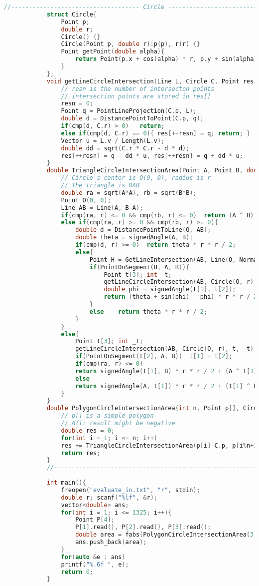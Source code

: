 \documentclass[withoutpreface,bwprint,fontset=macnew]{cumcmthesis} %
\begin{document}
\begin{appendices}
\begin{lstlisting}[language=c++]
			//------------------------------------ Circle ------------------------------------//
			struct Circle{
				Point p;
				double r;
				Circle() {}
				Circle(Point p, double r):p(p), r(r) {}
				Point getPoint(double alpha){
					return Point(p.x + cos(alpha) * r, p.y + sin(alpha) * r);
				}
			};
			void getLineCircleIntersection(Line L, Circle C, Point res[], int &resn){
				// resn is the number of intersecton points
				// intersection points are stored in res[]
				resn = 0;
				Point q = PointLineProjection(C.p, L);
				double d = DistancePointToPoint(C.p, q);
				if(cmp(d, C.r) > 0)   return;                           // separated
				else if(cmp(d, C.r) == 0){ res[++resn] = q; return; }   // tangent
				Vector u = L.v / Length(L.v);
				double dd = sqrt(C.r * C.r - d * d);
				res[++resn] = q - dd * u, res[++resn] = q + dd * u;     // intersected
			}
			double TriangleCircleIntersectionArea(Point A, Point B, double r){
				// Circle's center is O(0, 0), radius is r
				// The triangle is OAB
				double ra = sqrt(A*A), rb = sqrt(B*B);
				Point O(0, 0);
				Line AB = Line(A, B-A);
				if(cmp(ra, r) <= 0 && cmp(rb, r) <= 0)	return (A ^ B) / 2;
				else if(cmp(ra, r) >= 0 && cmp(rb, r) >= 0){
					double d = DistancePointToLine(O, AB);
					double theta = signedAngle(A, B);
					if(cmp(d, r) >= 0)	return theta * r * r / 2;
					else{
						Point H = GetLineIntersection(AB, Line(O, Normal(B-A)));
						if(PointOnSegment(H, A, B)){
							Point t[3]; int _t;
							getLineCircleIntersection(AB, Circle(O, r), t, _t);
							double phi = signedAngle(t[1], t[2]);
							return (theta + sin(phi) - phi) * r * r / 2;
						}
						else	return theta * r * r / 2;
					}
				}
				else{
					Point t[3]; int _t;
					getLineCircleIntersection(AB, Circle(O, r), t, _t);
					if(PointOnSegment(t[2], A, B))	t[1] = t[2];
					if(cmp(ra, r) <= 0)
					return signedAngle(t[1], B) * r * r / 2 + (A ^ t[1]) / 2;
					else
					return signedAngle(A, t[1]) * r * r / 2 + (t[1] ^ B) / 2;
				}
			}
			double PolygonCircleIntersectionArea(int n, Point p[], Circle C){
				// p[] is a simple polygon
				// ATT: result might be negative
				double res = 0;
				for(int i = 1; i <= n; i++)
				res += TriangleCircleIntersectionArea(p[i]-C.p, p[i%n+1]-C.p, C.r);
				return res;
			}
			//-----------------------------------------------------------------------------------------------//
			
			int main(){
				freopen("evaluate_in.txt", "r", stdin);
				double r; scanf("%lf", &r);
				vector<double> ans;
				for(int i = 1; i <= 1325; i++){
					Point P[4];
					P[1].read(), P[2].read(), P[3].read();
					double area = fabs(PolygonCircleIntersectionArea(3, P, Circle(Point(0, 0), r)));
					ans.push_back(area);
				}
				for(auto &e : ans)
				printf("%.6f ", e);
				return 0;
			}
	\end{lstlisting}
	

\end{appendices}
\end{document}

